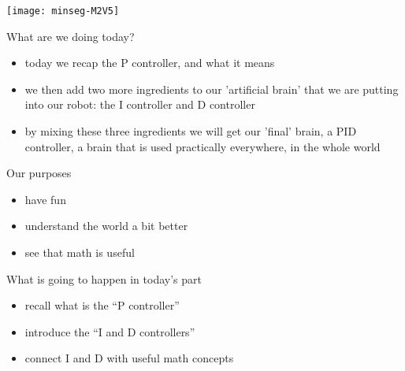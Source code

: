 \begin{frame}
	\titlepage
	\vspace{-1.8cm} 
	\begin{center}
		\texttt{[image: minseg-M2V5]}
	\end{center}
\end{frame}


\begin{frame}{What are we doing today?}
	\begin{itemize}
		\item today we recap the P controller, and what it means
		\item we then add two more ingredients to our 'artificial brain' that we are putting into our robot: the I controller and D controller
		\item by mixing these three ingredients we will get our 'final' brain, a PID controller, a brain that is used practically everywhere, in the whole world
	\end{itemize}
\end{frame}


\begin{frame}{Our purposes}
	\pause
	\begin{itemize}
		\item have fun
		\pause
		\item understand the world a bit better
		\pause
		\item see that math is useful
	\end{itemize}
\end{frame}


\begin{frame}{What is going to happen in today's part}
	\pause
	\begin{itemize}
		\item recall what is the ``P controller''
		\pause
		\item introduce the ``I and D controllers''
		\pause
		\item connect I and D with useful math concepts
	\end{itemize}
\end{frame}


